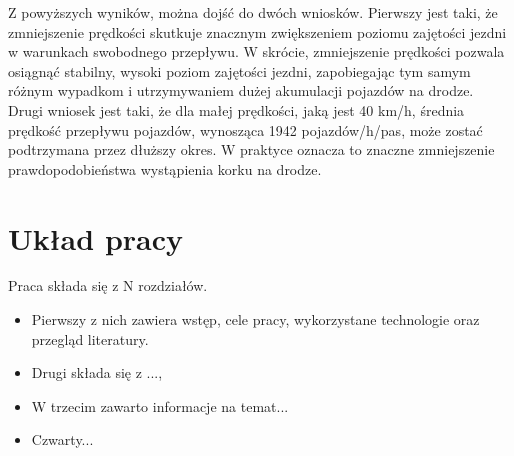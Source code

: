 Z powyższych wyników, można dojść do dwóch wniosków. Pierwszy jest taki, że zmniejszenie prędkości skutkuje znacznym zwiększeniem poziomu zajętości jezdni w warunkach swobodnego przepływu. W skrócie, zmniejszenie prędkości pozwala osiągnąć stabilny, wysoki poziom zajętości jezdni, zapobiegając tym samym różnym wypadkom i utrzymywaniem dużej akumulacji pojazdów na drodze. Drugi wniosek jest taki, że dla małej prędkości, jaką jest 40 km/h, średnia prędkość przepływu pojazdów, wynosząca 1942 pojazdów/h/pas, może zostać podtrzymana przez dłuższy okres. W praktyce oznacza to znaczne zmniejszenie prawdopodobieństwa wystąpienia korku na drodze.  

\section{Układ pracy}
\label{sec:ukladPracy}

Praca składa się z N rozdziałów. 

\begin{itemize}
\item Pierwszy z nich zawiera wstęp, cele pracy, wykorzystane technologie oraz przegląd literatury. 
\item Drugi składa się z ..., 
\item W trzecim zawarto informacje na temat...
\item Czwarty...
\end{itemize}